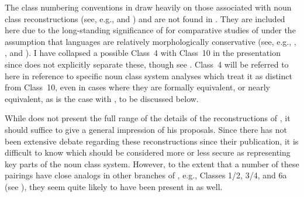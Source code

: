 \documentclass[output=paper ,collection	  ,collectionchapter ,biblatexbackend=biber   ]{langscibook}
\begin{document}
The class numbering conventions in  draw heavily on those
associated with  noun class reconstructions (see, e.g.,
 and ) and are not
found in . They are included here due to the long-standing
significance of  for comparative studies of  under
the assumption that  languages are relatively morphologically conservative
(see, e.g., , , and
). I have collapsed a possible Class~4 with Class~10 in the
presentation since  does not explicitly separate these,
though see . Class~4 will be referred to here
in reference to specific noun class system analyses which treat it as
distinct from Class~10, even in cases where they are formally equivalent, or
nearly equivalent, as is the case with  \cite[33]{Hyman1981}, to be
discussed below.

While  does not present the full range of the details
of the reconstructions of , it should
suffice to give a general impression of his proposals. Since there has not been
extensive debate regarding these reconstructions since their publication, it is
difficult to know which should be considered more or less secure as representing
key parts of the  noun class system. However, to the extent
that a number of these pairings have close analogs in other branches of
, e.g., Classes 1/2, 3/4, and 6a (see
), they seem quite likely to have been
present in  as well.
\end{document}
